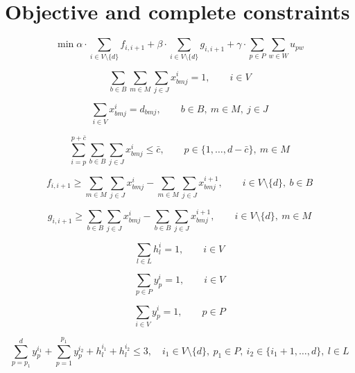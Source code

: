 \documentclass[10pt,a4paper]{article}
\begin{document}
\section*{Objective and complete constraints}

\begin{equation}
\min
\alpha \cdot \sum_{i \in V \setminus \{d\}} f_{i,i+1}
+ \beta \cdot \sum_{i \in V \setminus \{d\}} g_{i,i+1}
+ \gamma \cdot \sum_{p \in P} \sum_{w \in W} u_{pw}
\tag{1}
\end{equation}

\begin{equation}
\sum_{b \in B} \sum_{m \in M} \sum_{j \in J} x_{bmj}^i = 1,
\qquad i \in V
\tag{2}
\end{equation}

\begin{equation}
\sum_{i \in V} x_{bmj}^i = d_{bmj},
\qquad b \in B,\ m \in M,\ j \in J
\tag{3}
\end{equation}

\begin{equation}
\sum_{i=p}^{p+\bar{c}} \sum_{b \in B} \sum_{j \in J} x_{bmj}^i \le \bar{c},
\qquad p \in \{1,\ldots,d-\bar{c}\},\ m \in M
\tag{4}
\end{equation}

\begin{equation}
f_{i,i+1}
\ge
\sum_{m \in M} \sum_{j \in J} x_{bmj}^i
- \sum_{m \in M} \sum_{j \in J} x_{bmj}^{i+1},
\qquad i \in V \setminus \{d\},\ b \in B
\tag{5}
\end{equation}

\begin{equation}
g_{i,i+1}
\ge
\sum_{b \in B} \sum_{j \in J} x_{bmj}^i
- \sum_{b \in B} \sum_{j \in J} x_{bmj}^{i+1},
\qquad i \in V \setminus \{d\},\ m \in M
\tag{6}
\end{equation}

\begin{equation}
\sum_{l \in L} h_l^i = 1,
\qquad i \in V
\tag{7}
\end{equation}

\begin{equation}
\sum_{p \in P} y_p^i = 1,
\qquad i \in V
\tag{8}
\end{equation}

\begin{equation}
\sum_{i \in V} y_p^i = 1,
\qquad p \in P
\tag{9}
\end{equation}

\begin{equation}
\sum_{p=p_1}^{d} y_p^{i_1}
+ \sum_{p=1}^{p_1} y_p^{i_2}
+ h_l^{i_1}
+ h_l^{i_2}
\le 3,
\quad
i_1 \in V \setminus \{d\},\ p_1 \in P,\ i_2 \in \{i_1+1,\ldots,d\},\ l \in L
\tag{10}
\end{equation}
\end{document}
